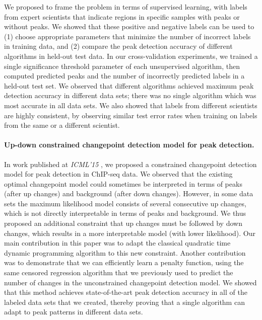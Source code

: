 \documentclass{article}
\begin{document}
We proposed to frame the problem in terms of supervised learning, with
labels from expert scientists that indicate regions in specific
samples with peaks or without peaks. We showed that these positive and
negative labels can be used to (1) choose appropriate parameters that
minimize the number of incorrect labels in training data, and (2)
compare the peak detection accuracy of different algorithms in
held-out test data. In our cross-validation experiments, we trained a
single significance threshold parameter of each unsupervised
algorithm, then computed predicted peaks and the number of incorrectly
predicted labels in a held-out test set. We observed that different
algorithms achieved maximum peak detection accuracy in different data
sets; there was no single algorithm which was most accurate in all
data sets. We also showed that labels from different scientists are
highly consistent, by observing similar test error rates when training
on labels from the same or a different scientist.

\paragraph{Up-down constrained changepoint detection model for peak
  detection.} In work published at \emph{ICML'15}
\citep{HOCKING-PeakSeg}, we proposed a constrained changepoint
detection model for peak detection in ChIP-seq data. We observed that
the existing optimal changepoint model could sometimes be interpreted
in terms of peaks (after up changes) and background (after down
changes). However, in some data sets the maximum likelihood model
consists of several consecutive up changes, which is not directly
interpretable in terms of peaks and background. We thus proposed an
additional constraint that up changes must be followed by down
changes, which results in a more interpretable model (with lower
likelihood). Our main contribution in this paper was to adapt the
classical quadratic time dynamic programming algorithm to this new
constraint. Another contribution was to demonstrate that we can
efficiently learn a penalty function, using the same censored
regression algorithm that we previously used to predict the number of
changes in the unconstrained changepoint detection model. We showed
that this method achieves state-of-the-art peak detection accuracy in
all of the labeled data sets that we created, thereby proving that a
single algorithm can adapt to peak patterns in different data sets.
\end{document}
